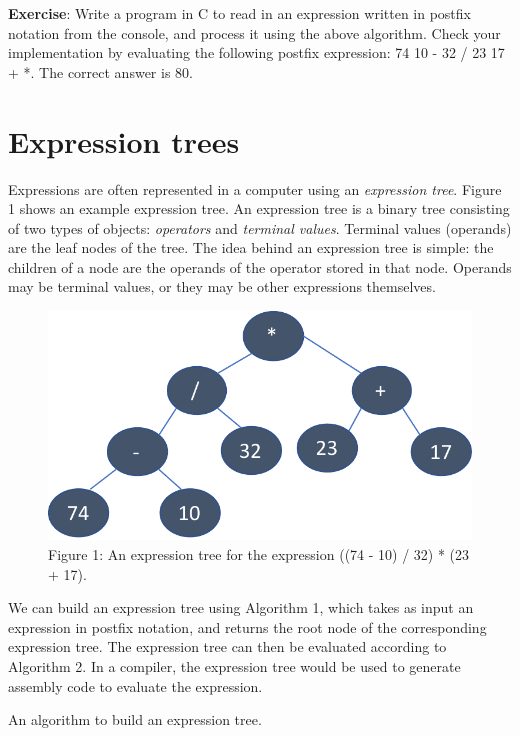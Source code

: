 \documentclass[10pt, a4paper, twosize]{article}
\begin{document}
\textbf{Exercise}: Write a program in C to read in an expression written in postfix notation from the console, and process it using the above algorithm. Check your implementation by evaluating the following postfix expression: 74 10 - 32 / 23 17 + *. The correct answer is 80.

\section{Expression trees}
Expressions are often represented in a computer using an \emph{expression tree}. Figure 1 shows an example expression tree. An expression tree is a binary tree consisting of two types of objects: \emph{operators} and \emph{terminal values}. Terminal values (operands) are the leaf nodes of the tree. The idea behind an expression tree is simple: the children of a node are the operands of the operator stored in that node. Operands may be terminal values, or they may be other expressions themselves.   
  \begin{figure}
        \includegraphics[scale=0.8]{expression_tree}
        \caption{Figure 1: An expression tree for the expression ((74 - 10) / 32) * (23 + 17).}
        \end{figure}

We can build an expression tree using Algorithm 1, which takes as input an expression in postfix notation, and returns the root node of the corresponding expression tree. The expression tree can then be evaluated according to Algorithm 2. In a compiler, the expression tree would be used to generate assembly code to evaluate the expression.

\begin{algorithm}[h]
\caption{An algorithm to build an expression tree.}
\end{algorithm}
\end{document}
